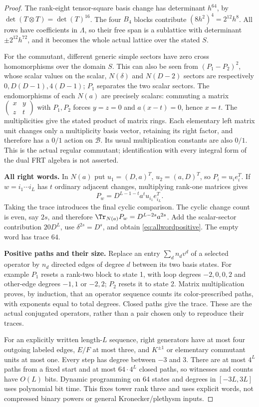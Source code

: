 \documentclass[11pt,a4paper]{article}
\theoremstyle{named}\newtheorem{finding}{Finding}[section]
\theoremstyle{definition}\newtheorem{definition}[finding]{Definition}
\theoremstyle{remark}\newtheorem{remark}[finding]{Remark}
\begin{document}
\begin{proof}
The rank-eight tensor-square basis change has determinant $h^{64}$,
by $\det(T\otimes T)=\det(T)^{16}$.
The four $B_4$ blocks contribute $(8h^2)^4=2^{12}h^8$.
All rows have coefficients in $\Lambda$, so their free span is a
sublattice with determinant $\pm2^{12}h^{72}$, and it becomes the
whole actual lattice over the stated $S$.

For the commutant, different generic simple sectors have zero
cross homomorphisms over the domain $S$.
This can also be seen from $(P_1-P_2)^2$, whose scalar values
on the scalar, $N(\delta)$ and $N(D-2)$ sectors are respectively
$0,D(D-1),4(D-1)$; $P_1$ separates the two scalar sectors.
The endomorphisms of each $N(a)$ are precisely scalars:
commuting a matrix $\left(\begin{smallmatrix}x&y\\z&t\end{smallmatrix}\right)$
with $P_1,P_2$ forces $y=z=0$ and $a(x-t)=0$, hence $x=t$.
The multiplicities give the stated product of matrix rings.
Each elementary left matrix unit changes only a multiplicity basis
vector, retaining its right factor, and therefore has a $0/1$
action on $\mathcal B$. Its usual multiplication constants are
also $0/1$. This is the actual regular commutant; identification
with every integral form of the dual FRT algebra is not asserted.

\par\smallskip\noindent\textbf{All right words.}\quad
In $N(a)$ put $u_1=(D,a)^T$, $u_2=(a,D)^T$, so $P_i=u_i e_i^T$.
If $w=i_1\cdots i_L$ has $t$ ordinary adjacent changes, multiplying
rank-one matrices gives
\[
 P_w=D^{L-1-t}a^t u_{i_1}e_{i_L}^T.
\]
Taking the trace introduces the final cyclic comparison.
The cyclic change count is even, say $2s$, and therefore
$\Tr_{N(a)}P_w=D^{L-2s}a^{2s}$.
Add the scalar-sector contribution $20D^L$, use
$\delta^{2s}=D^s$, and obtain \eqref{eq:allwordpositive}.
The empty word has trace $64$.

\par\smallskip\noindent\textbf{Positive paths and their size.}\quad
Replace an entry $\sum_d n_dv^d$ of a selected operator by $n_d$
directed edges of degree $d$ between its two basis states.
For example $P_1$ resets a rank-two block to state 1, with loop
degrees $-2,0,0,2$ and other-edge degrees $-1,1$ or $-2,2$;
$P_2$ resets it to state 2. Matrix multiplication proves, by
induction, that an operator sequence counts its color-prescribed
paths, with exponents equal to total degrees. Closed paths give
the trace. These are the actual conjugated operators, rather than
a pair chosen only to reproduce their traces.

For an explicitly written length-$L$ sequence, right generators
have at most four outgoing labeled edges, $E/F$ at most three,
and $K^{\pm1}$ or elementary commutant units at most one.
Every step has degree between $-3$ and $3$.
There are at most $4^L$ paths from a fixed start and at most
$64\cdot4^L$ closed paths, so witnesses and counts have $O(L)$
bits. Dynamic programming on 64 states and degrees in $[-3L,3L]$
uses polynomial bit time. This fixes tower rank three and uses
explicit words, not compressed binary powers or general
Kronecker/plethysm inputs.
\end{proof}
\end{document}
